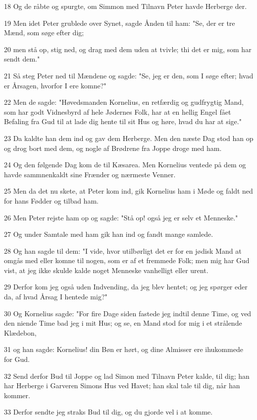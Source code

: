 \par 18 Og de råbte og spurgte, om Simmon med Tilnavn Peter havde Herberge der.
\par 19 Men idet Peter grublede over Synet, sagde Ånden til ham: "Se, der er tre Mænd, som søge efter dig;
\par 20 men stå op, stig ned, og drag med dem uden at tvivle; thi det er mig, som har sendt dem."
\par 21 Så steg Peter ned til Mændene og sagde: "Se, jeg er den, som I søge efter; hvad er Årsagen, hvorfor I ere komne?"
\par 22 Men de sagde: "Høvedsmanden Kornelius, en retfærdig og gudfrygtig Mand, som har godt Vidnesbyrd af hele Jødernes Folk, har at en hellig Engel fået Befaling fra Gud til at lade dig hente til sit Hus og høre, hvad du har at sige."
\par 23 Da kaldte han dem ind og gav dem Herberge. Men den næste Dag stod han op og drog bort med dem, og nogle af Brødrene fra Joppe droge med ham.
\par 24 Og den følgende Dag kom de til Kæsarea. Men Kornelius ventede på dem og havde sammnenkaldt sine Frænder og nærmeste Venner.
\par 25 Men da det nu skete, at Peter kom ind, gik Kornelius ham i Møde og faldt ned for hans Fødder og tilbad ham.
\par 26 Men Peter rejste ham op og sagde: "Stå op! også jeg er selv et Menneske."
\par 27 Og under Samtale med ham gik han ind og fandt mange samlede.
\par 28 Og han sagde til dem: "I vide, hvor utilbørligt det er for en jødisk Mand at omgås med eller komne til nogen, som er af et fremmede Folk; men mig har Gud vist, at jeg ikke skulde kalde noget Menneske vanhelligt eller urent.
\par 29 Derfor kom jeg også uden Indvending, da jeg blev hentet; og jeg spørger eder da, af hvad Årsag I hentede mig?"
\par 30 Og Kornelius sagde: "For fire Dage siden fastede jeg indtil denne Time, og ved den niende Time bad jeg i mit Hus; og se, en Mand stod for mig i et strålende Klædebon,
\par 31 og han sagde: Kornelius! din Bøn er hørt, og dine Almisser ere ihukommede for Gud.
\par 32 Send derfor Bud til Joppe og lad Simon med Tilnavn Peter kalde, til dig; han har Herberge i Garveren Simons Hus ved Havet; han skal tale til dig, når han kommer.
\par 33 Derfor sendte jeg straks Bud til dig, og du gjorde vel i at komme.
